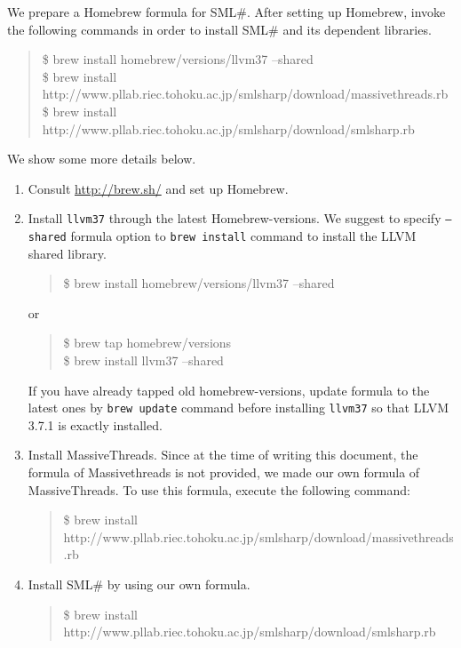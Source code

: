 \documentclass{jbook}
\newcommand{\smlsharp}{SML\#}
\newenvironment{program}{\begin{quote}\begin{tt}}%
                        {\end{tt}\end{quote}}
\begin{document}
\else%

	We prepare a Homebrew formula for \smlsharp{}.
	After setting up Homebrew, invoke the following commands in order to
install \smlsharp{} and its dependent libraries.
\begin{program}
\$ brew install homebrew/versions/llvm37 --shared\\
\$ brew install http://www.pllab.riec.tohoku.ac.jp/smlsharp/download/massivethreads.rb\\
\$ brew install http://www.pllab.riec.tohoku.ac.jp/smlsharp/download/smlsharp.rb
\end{program}

	We show some more details below.
\begin{enumerate}
\item 
	Consult \url{http://brew.sh/} and set up Homebrew.

\item
	Install {\tt llvm37} through the latest Homebrew-versions.
	We suggest to specify {\tt --shared} formula option to
{\tt brew install} command to install the LLVM shared library.
\begin{program}
\$ brew install homebrew/versions/llvm37 --shared
\end{program}
or
\begin{program}
\$ brew tap homebrew/versions\\
\$ brew install llvm37 --shared
\end{program}
	If you have already tapped old homebrew-versions,
update formula to the latest ones by {\tt brew update} command before
installing {\tt llvm37} so that LLVM 3.7.1 is exactly installed.

\item
	Install MassiveThreads.
	Since at the time of writing this document, the formula of
Massivethreads is not provided,
we made our own formula of MassiveThreads.
	To use this formula, execute the following command:
\begin{program}
\$ brew install http://www.pllab.riec.tohoku.ac.jp/smlsharp/download/massivethreads.rb
\end{program}

\item
	Install \smlsharp{} by using our own formula.
\begin{program}
\$ brew install http://www.pllab.riec.tohoku.ac.jp/smlsharp/download/smlsharp.rb
\end{program}
\end{enumerate}
\end{document}
